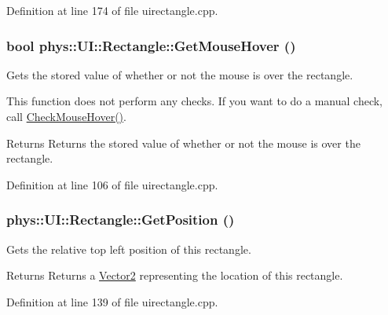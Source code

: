 Definition at line 174 of file uirectangle.cpp.

\hypertarget{classphys_1_1UI_1_1Rectangle_a20903adb6d1b8650d73774190a2b9c57}{
\subsubsection[{GetMouseHover}]{\setlength{\rightskip}{0pt plus 5cm}bool phys::UI::Rectangle::GetMouseHover ()}}
\label{d1/d5d/classphys_1_1UI_1_1Rectangle_a20903adb6d1b8650d73774190a2b9c57}


Gets the stored value of whether or not the mouse is over the rectangle. 

This function does not perform any checks. If you want to do a manual check, call \hyperlink{classphys_1_1UI_1_1Rectangle_a246070a93416c2c50d63720b354154d7}{CheckMouseHover()}. \begin{DoxyReturn}{Returns}
Returns the stored value of whether or not the mouse is over the rectangle. 
\end{DoxyReturn}


Definition at line 106 of file uirectangle.cpp.

\hypertarget{classphys_1_1UI_1_1Rectangle_aa0e2d6170f0b2d5b1f915c705e7fca10}{
\subsubsection[{GetPosition}]{ phys::UI::Rectangle::GetPosition ()}}
\label{d1/d5d/classphys_1_1UI_1_1Rectangle_aa0e2d6170f0b2d5b1f915c705e7fca10}


Gets the relative top left position of this rectangle. 

\begin{DoxyReturn}{Returns}
Returns a \hyperlink{classphys_1_1Vector2}{Vector2} representing the location of this rectangle. 
\end{DoxyReturn}


Definition at line 139 of file uirectangle.cpp.

